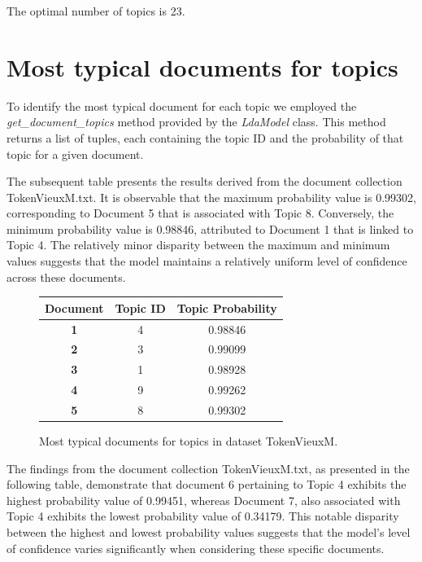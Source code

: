 \documentclass[10pt]{article} %
\begin{document}
	The optimal number of topics is 23.
	
\section{Most typical documents for topics}
To identify the most typical document for each topic we employed the \textit{get\_document\_topics} method provided by the \textit{LdaModel} class. This method returns a list of tuples, each containing the topic ID and the probability of that topic for a given document. 

The subsequent table presents the results derived from the document collection TokenVieuxM.txt. It is observable that the maximum probability value is 0.99302, corresponding to Document 5 that is associated with Topic 8. Conversely, the minimum probability value is 0.98846, attributed to Document 1 that is linked to Topic 4. The relatively minor disparity between the maximum and minimum values suggests that the model maintains a relatively uniform level of confidence across these documents.

\begin{figure}[H]
	\centering
	\begin{tabular}{|c|c|c|}
		\hline \textbf{Document} & \textbf{Topic ID} & \textbf{Topic Probability}  \\  
		\hline \textbf{1} & 4 & 0.98846 \\
		\hline \textbf{2} & 3 & 0.99099 \\
		\hline \textbf{3} & 1 & 0.98928 \\
		\hline \textbf{4} & 9 & 0.99262 \\
		\hline \textbf{5} & 8 & 0.99302 \\
		\hline
	\end{tabular}
	\caption{Most typical documents for topics in dataset TokenVieuxM.}
\end{figure}

The findings from the document collection TokenVieuxM.txt, as presented in the following table, demonstrate that document 6 pertaining to Topic 4 exhibits the highest probability value of 0.99451, whereas Document 7, also associated with Topic 4 exhibits the lowest probability value of 0.34179. This notable disparity between the highest and lowest probability values suggests that the model's level of confidence varies significantly when considering these specific documents.
\end{document}
